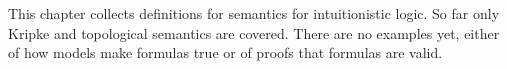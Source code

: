 \documentclass[../../../include/open-logic-chapter]{subfiles}
\begin{document}

\begin{editorial}
  This chapter collects definitions for semantics for intuitionistic
  logic. So far only Kripke and topological semantics are
  covered. There are no examples yet, either of how models make
  formulas true or of proofs that formulas are valid.
\end{editorial}





\OLEndChapterHook
\end{document}
